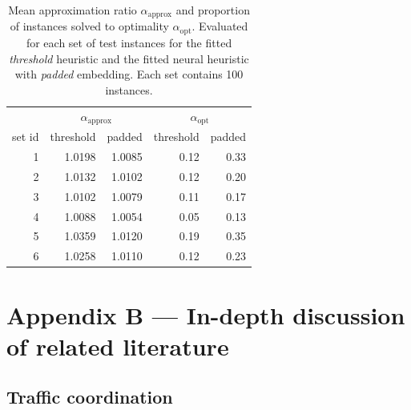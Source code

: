 \documentclass{article}
\theoremstyle{definition}
\theoremstyle{plain}
\begin{document}
%
%
%

\begin{knitrout}
\color{fgcolor}\begin{table}[H]
\centering
\caption{\label{tab:unnamed-chunk-2}Mean approximation ratio
  $\alpha_\text{approx}$ and proportion of instances solved to optimality
  $\alpha_\text{opt}$. Evaluated for each set of test instances for the fitted
  \textit{threshold} heuristic and the fitted neural heuristic with
  \textit{padded} embedding. Each set contains 100
  instances. \label{tab:objectives}}
\vspace{0.5em}
\centering
\begin{tabular}[t]{rrrrr}
\toprule
\multicolumn{1}{c}{ } & \multicolumn{2}{c}{$\alpha_\text{approx}$} & \multicolumn{2}{c}{$\alpha_\text{opt}$} \\
\cmidrule(l{3pt}r{3pt}){2-3} \cmidrule(l{3pt}r{3pt}){4-5}
set id & threshold & padded &  threshold & padded \\
\midrule
1 & 1.0198 & 1.0085  & 0.12 & 0.33\\
2 & 1.0132 & 1.0102  & 0.12 & 0.20\\
3 & 1.0102 & 1.0079  & 0.11 & 0.17\\
4 & 1.0088 & 1.0054  & 0.05 & 0.13\\
5 & 1.0359 & 1.0120  & 0.19 & 0.35\\
6 & 1.0258 & 1.0110  & 0.12 & 0.23\\
\bottomrule
\end{tabular}
\end{table}

\end{knitrout}

\newpage

\section*{Appendix B --- In-depth discussion of related literature}

\renewcommand{\thesection}{B}
\setcounter{subsection}{0}


\subsection{Traffic coordination}
\end{document}
